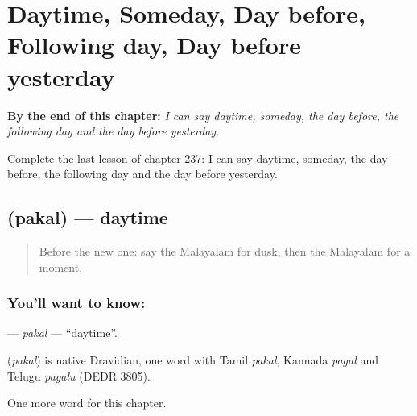 
\chapter{Daytime, Someday, Day before, Following day, Day before yesterday}
\label{ch:ml-daytime-someday-day-before-following-day-day-before-yesterday}

\begin{chapteropening}
\textbf{By the end of this chapter:} \emph{I can say daytime, someday, the day before, the following day and the day before yesterday.}

Complete the last lesson of chapter 237: I can say daytime, someday, the day before, the following day and the day before yesterday.
\end{chapteropening}

\section[\texorpdfstring{\ml{പകൽ} (pakal)}{പകൽ (pakal)}]{ (pakal) — daytime}

\label{lesson:ML-C237-pakal}



\begin{quote}
Before the new one: say the Malayalam for dusk, then the Malayalam for a moment.
\end{quote}

\subsection*{You'll want to know: }
\textbf{} — \emph{pakal} — \textquotedblleft{}daytime\textquotedblright{}.

\begin{cousinweb}
\textbf{} (\emph{pakal}) is native Dravidian, one word with Tamil \emph{pakal}, Kannada \emph{pagal} and Telugu \emph{pagalu} (DEDR 3805).
\end{cousinweb}

\begin{grammarlens}[title={What you've built}]
One more word for this chapter.
\end{grammarlens}

